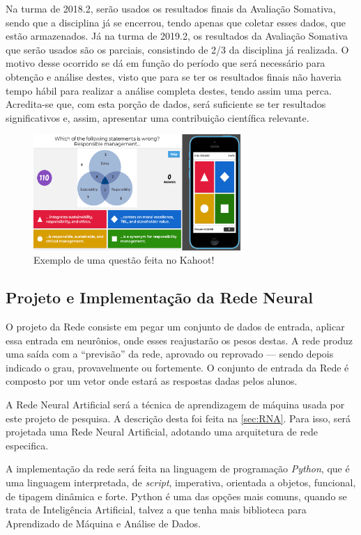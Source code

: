 \documentclass[
	12pt,				%
	openright,			%
	oneside,
	a4paper,			%
	english,			%
	french,				%
	spanish,			%
	brazil,				%
	]{abntex2}
\begin{document}
Na turma de 2018.2, serão usados os resultados finais da Avaliação Somativa, sendo que a disciplina já se encerrou, tendo apenas que coletar esses dados, que estão armazenados. Já na turma de 2019.2, os resultados da Avaliação Somativa que serão usados são os parciais, consistindo de 2/3 da disciplina já realizada. O motivo desse ocorrido se dá em função do período que será necessário para obtenção e análise destes, visto que para se ter os resultados finais não haveria tempo hábil para realizar a análise completa destes, tendo assim uma perca. Acredita-se que, com esta porção de dados, será suficiente se ter resultados significativos e, assim, apresentar uma contribuição científica relevante.

\begin{figure}
    \centering
    \includegraphics[width=0.7\textwidth]{Modelo_Projeto_Pesquisa_UFG_REJ_BCC/KahootScreenshot.png}
    \caption{Exemplo de uma questão feita no Kahoot!}
    \label{fig:kahoot}
\end{figure}
 
\subsection{Projeto e Implementação da Rede Neural}

O projeto da Rede consiste em pegar um conjunto de dados de entrada, aplicar essa entrada em neurônios, onde esses reajustarão os pesos destas. A rede produz uma saída com a ``previsão'' da rede, aprovado ou reprovado --- sendo depois indicado o grau, provavelmente ou fortemente. O conjunto de entrada da Rede é composto por um vetor onde estará as respostas dadas pelos alunos.

A Rede Neural Artificial será a técnica de aprendizagem de máquina usada por este projeto de pesquisa. A descrição desta foi feita na \autoref{sec:RNA}. Para isso, será projetada uma Rede Neural Artificial, adotando uma arquitetura de rede especifica.

A implementação da rede será feita na linguagem de programação \textit{Python}, que é uma linguagem interpretada, de \textit{script}, imperativa, orientada a objetos, funcional, de tipagem dinâmica e forte. Python é uma das opções mais comuns, quando se trata de Inteligência Artificial, talvez a que tenha mais biblioteca para Aprendizado de Máquina e Análise de Dados.
\end{document}
